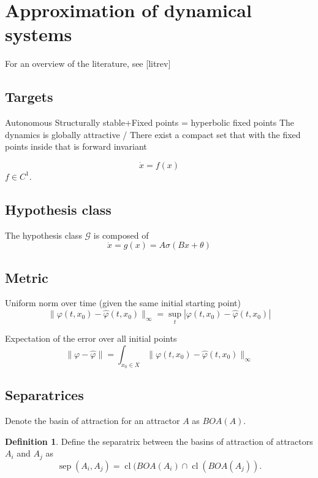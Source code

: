 \documentclass{article}
\theoremstyle{definition}
\newtheorem{definition}{Definition}
\theoremstyle{remark}
\newcommand{\sep}{\operatorname{sep}}
\newcommand{\cl}{\operatorname{cl}}
\begin{document}
\section{Approximation of dynamical systems}
For an overview of the literature, see [litrev]

\subsection{Targets}
Autonomous
Structurally stable+Fixed points = hyperbolic fixed points
The dynamics is globally attractive / There exist a compact set that with the fixed points inside that is forward invariant 

\begin{equation}
\dot x = f(x)
\end{equation}
$f\in C^1$.

\subsection{Hypothesis class}
The hypothesis class $\mathcal{G}$ is composed of
\begin{equation}
\dot x = g(x) = A\sigma(Bx+\theta)
\end{equation}


\subsection{Metric}

Uniform norm over time (given the same initial starting point)
\begin{equation}
\|\varphi(t,x_0)-\hat \varphi(t,x_0)\|_\infty = \sup_t|\varphi(t,x_0)-\hat \varphi(t,x_0)|
\end{equation}


Expectation of the error over all initial points
\begin{equation}
\|\varphi-\hat \varphi\| = \int_{x_0\in X}\|\varphi(t,x_0)-\hat \varphi(t,x_0)\|_\infty
\end{equation}


\subsection{Separatrices}

Denote the basin of attraction for an attractor $A$ as $BOA(A)$.

\begin{definition}	
Define the separatrix between the basins of attraction of attractors $A_i$ and $A_j$ as 
\begin{equation}
\sep(A_i,A_j) = \cl(BOA(A_i)\cap \cl(BOA(A_j)).
\end{equation}
\end{definition}
\end{document}
